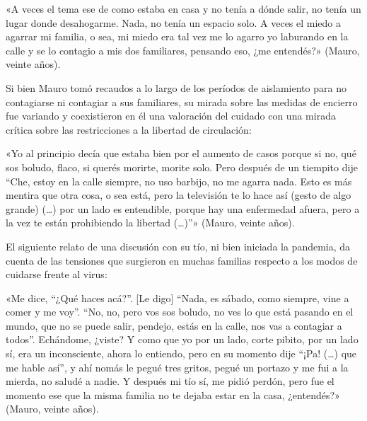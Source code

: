 \begin{refsection}
\begin{gbcita}
«A veces el tema ese de como estaba en casa y no tenía a dónde salir, no tenía un lugar donde desahogarme. Nada, no tenía un espacio solo. A veces el miedo a agarrar mi familia, o sea, mi miedo era tal vez me lo agarro yo laburando en la calle y se lo contagio a mis dos familiares, pensando eso, ¿me entendés?» (Mauro, veinte años).

\end{gbcita}

Si bien Mauro tomó recaudos a lo largo de los períodos de aislamiento para no contagiarse ni contagiar a sus familiares, su mirada sobre las medidas de encierro fue variando y coexistieron en él una valoración del cuidado con una mirada crítica sobre las restricciones a la libertad de circulación:


\begin{gbcita}
«Yo al principio decía que estaba bien por el aumento de casos porque si no, qué sos boludo, flaco, si querés morirte, morite solo. Pero después de un tiempito dije “Che, estoy en la calle siempre, no uso barbijo, no me agarra nada. Esto es más mentira que otra cosa, o sea está, pero la televisión te lo hace así (gesto de algo grande) (…) por un lado es entendible, porque hay una enfermedad afuera, pero a la vez te están prohibiendo la libertad (…)”» (Mauro, veinte años).

\end{gbcita}

El siguiente relato de una discusión con su tío, ni bien iniciada la pandemia, da cuenta de las tensiones que surgieron en muchas familias respecto a los modos de cuidarse frente al virus:


\begin{gbcita}
«Me dice, “¿Qué haces acá?”. [Le digo] “Nada, es sábado, como siempre, vine a comer y me voy”. “No, no, pero vos sos boludo, no ves lo que está pasando en el mundo, que no se puede salir, pendejo, estás en la calle, nos vas a contagiar a todos”. Echándome, ¿viste? Y como que yo por un lado, corte pibito, por un lado sí, era un inconsciente, ahora lo entiendo, pero en su momento dije “¡Pa! (…) que me hable así”, y ahí nomás le pegué tres gritos, pegué un portazo y me fui a la mierda, no saludé a nadie. Y después mi tío sí, me pidió perdón, pero fue el momento ese que la misma familia no te dejaba estar en la casa, ¿entendés?» (Mauro, veinte años).

\end{gbcita}


\end{refsection}
